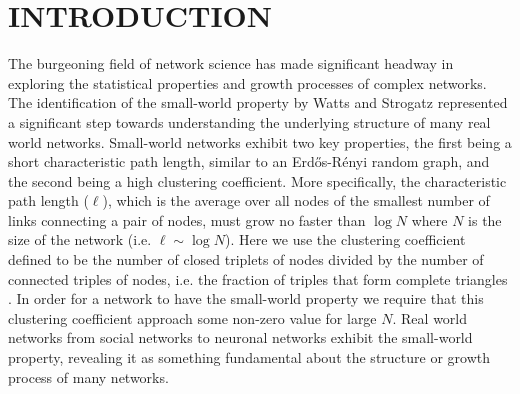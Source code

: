 \documentclass[aps,pre,manuscript,superscriptaddress,amsmath,amssymb,nofootinbib]{revtex4-1}
\begin{document}

\maketitle

\section{INTRODUCTION}
The burgeoning field of network science has made significant headway in exploring the statistical properties and growth processes of complex networks.
The identification of the small-world property by Watts and Strogatz \cite{wsnat} represented a significant step towards understanding the underlying structure of many real world networks.
Small-world networks exhibit two key properties, the first being a short characteristic path length, similar to an Erd\H{o}s-R\'{e}nyi random graph, and the second being a high clustering coefficient.
More specifically, the characteristic path length ($\ell$), which is the average over all nodes of the smallest number of links connecting a pair of nodes, must grow no faster than $\log N$ where $N$ is the size of the network (i.e. $\ell \sim \log N$).
Here we use the clustering coefficient defined to be the number of closed triplets of nodes divided by the number of connected triples of nodes, i.e. the fraction of triples that form complete triangles \cite{newmanrandom}.
In order for a network to have the small-world property we require that this clustering coefficient approach some non-zero value for large $N$.
Real world networks from social networks to neuronal networks exhibit the small-world property, revealing it as something fundamental about the structure or growth process of many networks.
\end{document}
